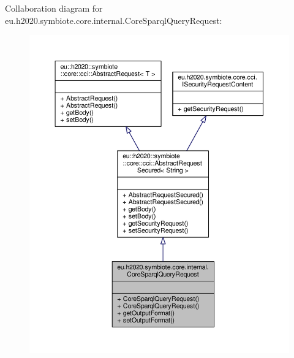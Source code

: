 Collaboration diagram for eu.\+h2020.\+symbiote.\+core.\+internal.\+Core\+Sparql\+Query\+Request\+:
\nopagebreak
\begin{figure}[H]
\begin{center}
\leavevmode
\includegraphics[width=350pt]{classeu_1_1h2020_1_1symbiote_1_1core_1_1internal_1_1CoreSparqlQueryRequest__coll__graph}
\end{center}
\end{figure}
